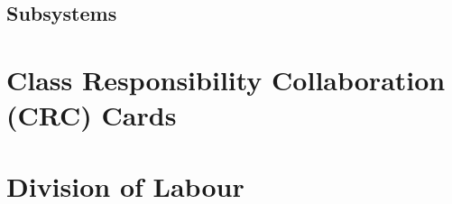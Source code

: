 \documentclass[titlepage,12pt]{article}
\begin{document}

\subsection{Subsystems}
\label{sub:subsystems}



    
\section{Class Responsibility Collaboration (CRC) Cards}
\label{sec:class_responsibility_collaboration_crc_cards}

%
%    


\newpage
\appendix
\section{Division of Labour}%
\label{sec:division_of_labour}
\end{document}
